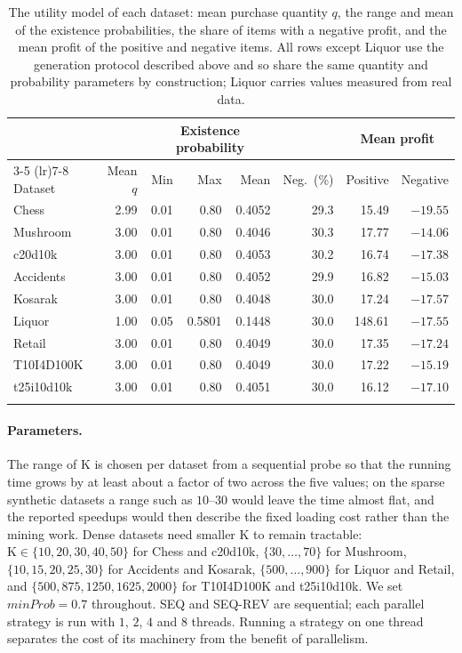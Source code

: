 \documentclass[pdflatex,sn-vancouver-num]{sn-jnl}
\theoremstyle{thmstyleone}%
\theoremstyle{thmstyletwo}%
\theoremstyle{thmstylethree}%
\newcommand{\minprob}{\mathit{minProb}}
\newcommand{\Kk}{\mathrm{K}}
\begin{document}
\begin{table}[t]
\caption{The utility model of each dataset: mean purchase quantity $q$, the
range and mean of the existence probabilities, the share of items with a
negative profit, and the mean profit of the positive and negative items. All
rows except Liquor use the generation protocol described above and so share the
same quantity and probability parameters by construction; Liquor carries values
measured from real data.}\label{tab:parameters}
\footnotesize\setlength{\tabcolsep}{4pt}
\begin{tabular}{@{}lrrrrrrr@{}}
\toprule
& & \multicolumn{3}{c}{Existence probability} & & \multicolumn{2}{c}{Mean profit} \\
\cmidrule(lr){3-5} \cmidrule(lr){7-8}
Dataset & Mean $q$ & Min & Max & Mean & Neg.\ (\%) & Positive & Negative \\
\midrule
Chess      & 2.99 & 0.01 & 0.80   & 0.4052 & 29.3 & 15.49  & $-19.55$ \\
Mushroom   & 3.00 & 0.01 & 0.80   & 0.4046 & 30.3 & 17.77  & $-14.06$ \\
c20d10k    & 3.00 & 0.01 & 0.80   & 0.4053 & 30.2 & 16.74  & $-17.38$ \\
Accidents  & 3.00 & 0.01 & 0.80   & 0.4052 & 29.9 & 16.82  & $-15.03$ \\
Kosarak    & 3.00 & 0.01 & 0.80   & 0.4048 & 30.0 & 17.24  & $-17.57$ \\
Liquor     & 1.00 & 0.05 & 0.5801 & 0.1448 & 30.0 & 148.61 & $-17.55$ \\
Retail     & 3.00 & 0.01 & 0.80   & 0.4049 & 30.0 & 17.35  & $-17.24$ \\
T10I4D100K & 3.00 & 0.01 & 0.80   & 0.4049 & 30.0 & 17.22  & $-15.19$ \\
t25i10d10k & 3.00 & 0.01 & 0.80   & 0.4051 & 30.0 & 16.12  & $-17.10$ \\
\botrule
\end{tabular}
\end{table}
 
\paragraph{Parameters.}
The range of $\Kk$ is chosen per dataset from a sequential probe so that
the running time grows by at least about a factor of two across the five
values; on the sparse synthetic datasets a range such as $10$--$30$
would leave the time almost flat, and the reported speedups would then
describe the fixed loading cost rather than the mining work. Dense
datasets need smaller $\Kk$ to remain tractable:
$\Kk\in\{10,20,30,40,50\}$ for Chess and c20d10k,
$\{30,\dots,70\}$ for Mushroom,
$\{10,15,20,25,30\}$ for Accidents and Kosarak,
$\{500,\dots,900\}$ for Liquor and Retail, and
$\{500,875,1250,1625,2000\}$ for T10I4D100K and t25i10d10k.
We set $\minprob=0.7$ throughout. SEQ and SEQ-REV are sequential; each
parallel strategy is run with $1$, $2$, $4$ and $8$ threads. Running a
strategy on one thread separates the cost of its machinery from the
benefit of parallelism.
 
\end{document}
